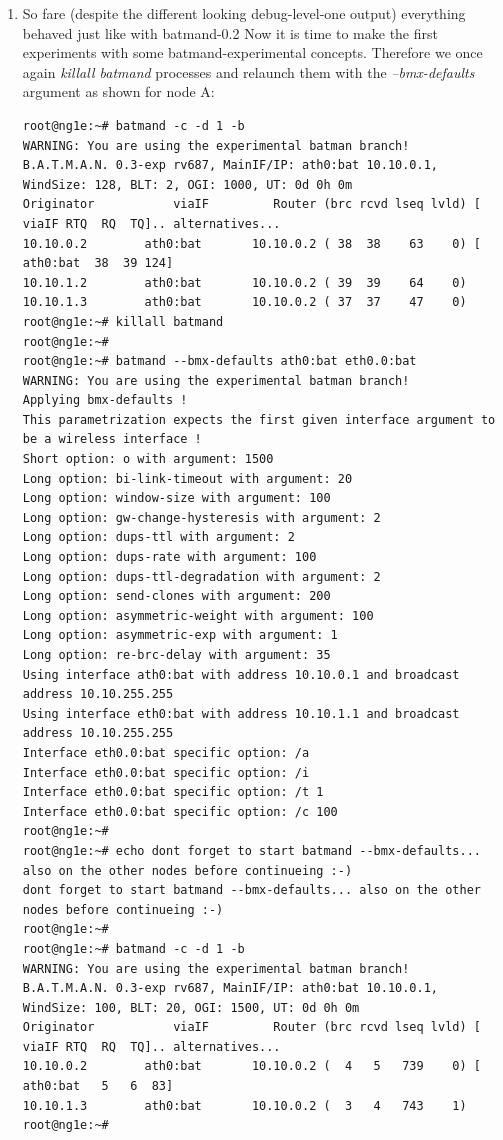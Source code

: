 \documentclass[11pt]{article}
\begin{document}
\begin{enumerate}
\item So fare (despite the different looking debug-level-one output) everything behaved just like with batmand-0.2
%
Now it is time to make the first experiments with some batmand-experimental concepts.
Therefore we once again \emph{killall batmand} processes and relaunch them with the \emph{--bmx-defaults} argument as shown for node A:

\begin{small} \begin{verbatim}
root@ng1e:~# batmand -c -d 1 -b
WARNING: You are using the experimental batman branch!
B.A.T.M.A.N. 0.3-exp rv687, MainIF/IP: ath0:bat 10.10.0.1, WindSize: 128, BLT: 2, OGI: 1000, UT: 0d 0h 0m
Originator           viaIF         Router (brc rcvd lseq lvld) [    viaIF RTQ  RQ  TQ].. alternatives...
10.10.0.2        ath0:bat       10.10.0.2 ( 38  38    63    0) [ ath0:bat  38  39 124]
10.10.1.2        ath0:bat       10.10.0.2 ( 39  39    64    0)
10.10.1.3        ath0:bat       10.10.0.2 ( 37  37    47    0)
root@ng1e:~# killall batmand
root@ng1e:~#
root@ng1e:~# batmand --bmx-defaults ath0:bat eth0.0:bat
WARNING: You are using the experimental batman branch!
Applying bmx-defaults !
This parametrization expects the first given interface argument to be a wireless interface !
Short option: o with argument: 1500
Long option: bi-link-timeout with argument: 20
Long option: window-size with argument: 100
Long option: gw-change-hysteresis with argument: 2
Long option: dups-ttl with argument: 2
Long option: dups-rate with argument: 100
Long option: dups-ttl-degradation with argument: 2
Long option: send-clones with argument: 200
Long option: asymmetric-weight with argument: 100
Long option: asymmetric-exp with argument: 1
Long option: re-brc-delay with argument: 35
Using interface ath0:bat with address 10.10.0.1 and broadcast address 10.10.255.255
Using interface eth0:bat with address 10.10.1.1 and broadcast address 10.10.255.255
Interface eth0.0:bat specific option: /a
Interface eth0.0:bat specific option: /i
Interface eth0.0:bat specific option: /t 1
Interface eth0.0:bat specific option: /c 100
root@ng1e:~#
root@ng1e:~# echo dont forget to start batmand --bmx-defaults... also on the other nodes before continueing :-)
dont forget to start batmand --bmx-defaults... also on the other nodes before continueing :-)
root@ng1e:~#
root@ng1e:~# batmand -c -d 1 -b
WARNING: You are using the experimental batman branch!
B.A.T.M.A.N. 0.3-exp rv687, MainIF/IP: ath0:bat 10.10.0.1, WindSize: 100, BLT: 20, OGI: 1500, UT: 0d 0h 0m
Originator           viaIF         Router (brc rcvd lseq lvld) [    viaIF RTQ  RQ  TQ].. alternatives...
10.10.0.2        ath0:bat       10.10.0.2 (  4   5   739    0) [ ath0:bat   5   6  83]
10.10.1.3        ath0:bat       10.10.0.2 (  3   4   743    1)
root@ng1e:~#


\end{verbatim}
\end{small}
\end{enumerate}
\end{document}
